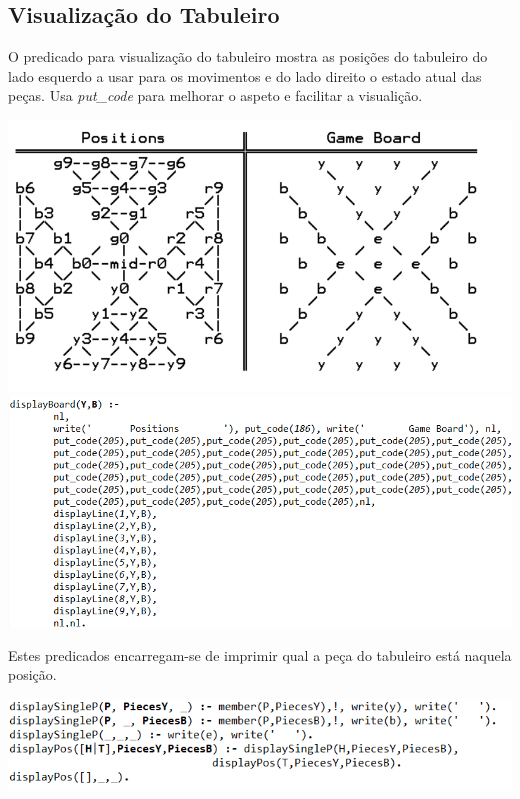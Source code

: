 \documentclass[a4paper]{article}
\begin{document}
\subsection{Visualização do Tabuleiro} O predicado para visualização do tabuleiro mostra as posições do tabuleiro do lado esquerdo a usar para os movimentos e do lado direito o estado atual das peças.  Usa \textit{put\_code} para melhorar o aspeto e facilitar a visualição. 

\includegraphics[scale=0.6]{gameBoard.png}\linebreak\linebreak
\includegraphics[scale=0.6]{displayBoard.png}\linebreak\linebreak

Estes predicados encarregam-se de imprimir qual a peça do tabuleiro está naquela posição. 

\includegraphics[scale=0.8]{displayBoard1.png}\linebreak\linebreak
\end{document}
